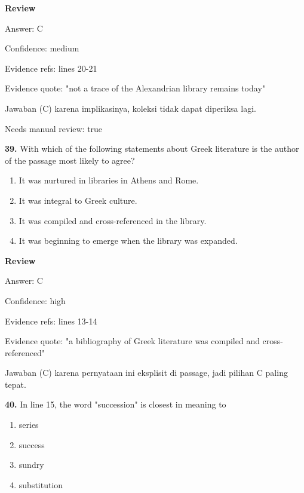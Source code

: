 \documentclass[12pt]{article}
\begin{document}
\setlength{\parskip}{0pt}
\setlength{\parindent}{0pt}
\textbf{Review}\par
Answer: C\par
Confidence: medium\par
Evidence refs: lines 20-21\par
Evidence quote: "not a trace of the Alexandrian library remains today"\par
Jawaban (C) karena implikasinya, koleksi tidak dapat diperiksa lagi.\par
Needs manual review: true\par
\endgroup
\par
\vspace{0.25\baselineskip}
\noindent\textbf{39.} With which of the following statements about Greek literature is the author of the passage most likely to agree?
\begin{enumerate}[label=(\Alph*),leftmargin=*,itemsep=0.2em]
\item It was nurtured in libraries in Athens and Rome.
\item It was integral to Greek culture.
\item It was compiled and cross-referenced in the library.
\item It was beginning to emerge when the library was expanded.
\end{enumerate}
\par
\begingroup
\setlength{\parskip}{0pt}
\setlength{\parindent}{0pt}
\textbf{Review}\par
Answer: C\par
Confidence: high\par
Evidence refs: lines 13-14\par
Evidence quote: "a bibliography of Greek literature was compiled and cross-referenced"\par
Jawaban (C) karena pernyataan ini eksplisit di passage, jadi pilihan C paling tepat.\par
\endgroup
\par
\vspace{0.25\baselineskip}
\noindent\textbf{40.} In line 15, the word "succession" is closest in meaning to
\begin{enumerate}[label=(\Alph*),leftmargin=*,itemsep=0.2em]
\item series
\item success
\item sundry
\item substitution
\end{enumerate}
\par
\end{document}
